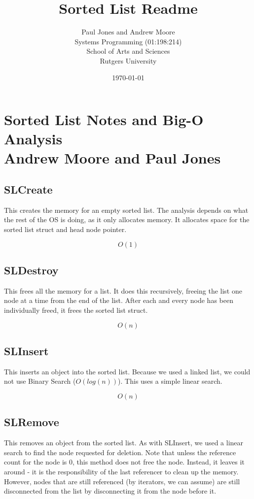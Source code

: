 \documentclass{article}
\title{Sorted List Readme}
\date{\today}
\author{Paul Jones and Andrew Moore \\ Systems Programming (01:198:214) \\ School of Arts and Sciences \\ Rutgers University}
\begin{document}
\clearpage

\thispagestyle{empty}

\section*{Sorted List Notes and Big-O Analysis\\Andrew Moore and Paul Jones}

\subsection*{SLCreate}

This creates the memory for an empty sorted list. The analysis depends on what the
rest of the OS is doing, as it only allocates memory. It allocates space for the sorted list struct and head node pointer. 

$$O(1)$$

\subsection*{SLDestroy}

This frees all the memory for a list. It does this recursively, freeing the list one node at a time from the end of the list. After each and every node has been individually freed, it frees the sorted list struct.

$$O(n)$$

\subsection*{SLInsert}

This inserts an object into the sorted list.
Because we used a linked list, we could not use Binary Search ($O(log(n))$). This uses a simple linear search.

$$O(n)$$

\subsection*{SLRemove}

This removes an object from the sorted list.
As with SLInsert, we used a linear search to find the node requested for deletion.
Note that unless the reference count for the node is 0, this method does not free the node. Instead, it leaves it around - it is the responsibility of the last referencer to clean up the memory.
However, nodes that are still referenced (by iterators, we can assume) are still disconnected from the list by disconnecting it from the node before it.
\end{document}
